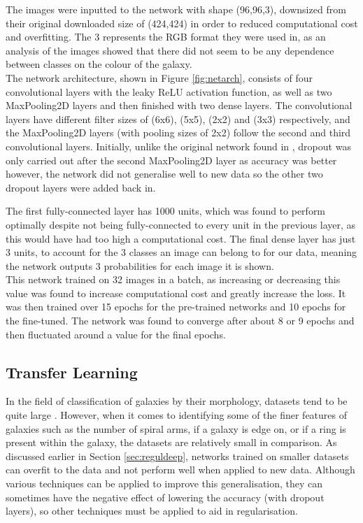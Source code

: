 \documentclass[12pt, onecolumn]{aa}
\begin{document}
The images were inputted to the network with shape (96,96,3), downsized from their original downloaded size of (424,424) in order to reduced computational cost and overfitting. The 3 represents the RGB format they were used in, as an analysis of the images showed that there did not seem to be any dependence between classes on the colour of the galaxy.\\

The network architecture, shown in Figure \ref{fig:netarch}, consists of four convolutional layers with the leaky ReLU activation function, as well as two MaxPooling2D layers and then finished with two dense layers. The convolutional layers have different filter sizes of (6x6), (5x5), (2x2) and (3x3) respectively, and the MaxPooling2D layers (with pooling sizes of 2x2) follow the second and third convolutional layers. Initially, unlike the original network found in \cite{sancheztransfer}, dropout was only carried out after the second MaxPooling2D layer as accuracy was better however, the network did not generalise well to new data so the other two dropout layers were added back in.

The first fully-connected layer has 1000 units, which was found to perform optimally despite not being fully-connected to every unit in the previous layer, as this would have had too high a computational cost. The final dense layer has just 3 units, to account for the 3 classes an image can belong to for our data, meaning the network outputs 3 probabilities for each image it is shown. \\

This network trained on 32 images in a batch, as increasing or decreasing this value was found to increase computational cost and greatly increase the loss. It was then trained over 15 epochs for the pre-trained networks and 10 epochs for the fine-tuned. The network was found to converge after about 8 or 9 epochs and then fluctuated around a value for the final epochs.



\subsection{Transfer Learning}\label{sec:transferdeep}
In the field of classification of galaxies by their morphology, datasets tend to be quite large \citep{dr14sdss}. However, when it comes to identifying some of the finer features of galaxies such as the number of spiral arms, if a galaxy is edge on, or if a ring is present within the galaxy, the datasets are relatively small in comparison. As discussed earlier in Section \ref{sec:reguldeep}, networks trained on smaller datasets can overfit to the data and not perform well when applied to new data. Although various techniques can be applied to improve this generalisation, they can sometimes have the negative effect of lowering the accuracy (with dropout layers), so other techniques must be applied to aid in regularisation.\\
\end{document}
